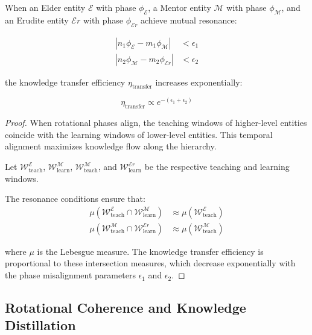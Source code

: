 \begin{theorem}
When an Elder entity $\mathcal{E}$ with phase $\phi_{\mathcal{E}}$, a Mentor entity $\mathcal{M}$ with phase $\phi_{\mathcal{M}}$, and an Erudite entity $\mathcal{E}r$ with phase $\phi_{\mathcal{E}r}$ achieve mutual resonance:

\begin{equation}
\begin{aligned}
|n_1\phi_{\mathcal{E}} - m_1\phi_{\mathcal{M}}| &< \epsilon_1 \\
|n_2\phi_{\mathcal{M}} - m_2\phi_{\mathcal{E}r}| &< \epsilon_2
\end{aligned}
\end{equation}

the knowledge transfer efficiency $\eta_{\text{transfer}}$ increases exponentially:

\begin{equation}
\eta_{\text{transfer}} \propto e^{-(\epsilon_1 + \epsilon_2)}
\end{equation}
\end{theorem}

\begin{proof}
When rotational phases align, the teaching windows of higher-level entities coincide with the learning windows of lower-level entities. This temporal alignment maximizes knowledge flow along the hierarchy.

Let $\mathcal{W}_{\text{teach}}^{\mathcal{E}}$, $\mathcal{W}_{\text{learn}}^{\mathcal{M}}$, $\mathcal{W}_{\text{teach}}^{\mathcal{M}}$, and $\mathcal{W}_{\text{learn}}^{\mathcal{E}r}$ be the respective teaching and learning windows.

The resonance conditions ensure that:
\begin{align}
\mu(\mathcal{W}_{\text{teach}}^{\mathcal{E}} \cap \mathcal{W}_{\text{learn}}^{\mathcal{M}}) &\approx \mu(\mathcal{W}_{\text{teach}}^{\mathcal{E}}) \\
\mu(\mathcal{W}_{\text{teach}}^{\mathcal{M}} \cap \mathcal{W}_{\text{learn}}^{\mathcal{E}r}) &\approx \mu(\mathcal{W}_{\text{teach}}^{\mathcal{M}})
\end{align}

where $\mu$ is the Lebesgue measure. The knowledge transfer efficiency is proportional to these intersection measures, which decrease exponentially with the phase misalignment parameters $\epsilon_1$ and $\epsilon_2$.
\end{proof}

\subsection{Rotational Coherence and Knowledge Distillation}

